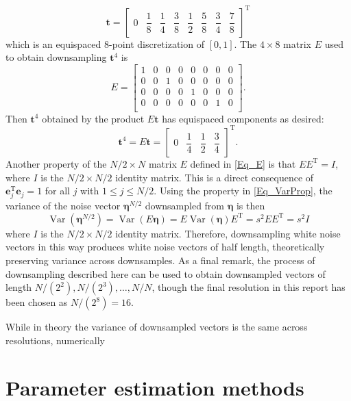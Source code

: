 \documentclass[12pt]{article}
\newcommand{\tdis}{\mathbf{t}}
\newcommand{\trans}{\mathrm{T}}	%
\newcommand{\SD}{s}	%
\newcommand{\noise}{\bm{\eta}}	%
\newcommand{\Var}{\operatorname{Var}}	%
\begin{document}
\[\tdis = \begin{bmatrix}
0 & \dfrac{1}{8} & \dfrac{1}{4} & \dfrac{3}{8} & \dfrac{1}{2} & \dfrac{5}{8} & \dfrac{3}{4} & \dfrac{7}{8}
\end{bmatrix}^{\trans}\]
which is an equispaced 8-point discretization of $[0,1]$. The $4 \times 8$ matrix $E$ used to obtain downsampling $\tdis^{4}$ is
\[E = \begin{bmatrix}
1 & 0 & 0 & 0 & 0 & 0 & 0 & 0 \\
0 & 0 & 1 & 0 & 0 & 0 & 0 & 0 \\
0 & 0 & 0 & 0 & 1 & 0 & 0 & 0 \\
0 & 0 & 0 & 0 & 0 & 0 & 1 & 0 \\
\end{bmatrix}.\]
Then $\tdis^4$ obtained by the product $E\tdis$ has equispaced components as desired:
\[\tdis^4 = E\tdis = \begin{bmatrix}
0 & \dfrac{1}{4} & \dfrac{1}{2} & \dfrac{3}{4}
\end{bmatrix}^{\trans}.\]
\indent Another property of the $N/2 \times N$ matrix $E$ defined in \eqref{Eq_E} is that $EE^{\trans} = I$, where $I$ is the $N/2 \times N/2$ identity matrix.  This is a direct consequence of $\mathbf{e}_j^\trans\mathbf{e}_j = 1$ for all $j$ with $1 \leq j \leq N/2$. Using the property in \eqref{Eq_VarProp}, the variance of the  noise vector $\noise^{N/2}$ downsampled from $\noise$ is then
\[\Var(\noise^{N/2}) = \Var(E\noise) = E\Var(\noise)E^{\trans} = \SD^2EE^{\trans} = \SD^2I\]
where $I$ is the $N/2 \times N/2$ identity matrix. Therefore, downsampling white noise vectors in this way produces white noise vectors of half length, theoretically preserving variance across downsamples. As a final remark, the process of downsampling described here can be used to obtain downsampled vectors of length $N/(2^2), N/(2^3), \ldots, N/N$, though the final resolution in this report has been chosen as $N/(2^8) = 16$. \par
While in theory the variance of downsampled vectors is the same across resolutions, numerically

\section{Parameter estimation methods}
\end{document}
